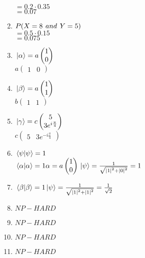 \documentclass[a4paper]{article}
\begin{document}
\begin{enumerate}[1.]
        $= 0.2 \cdot 0.35$\\
        $= 0.07$
        \item $P(X = 8 \hspace*{4px}and\hspace*{4px} Y = 5)$\\
        $= 0.5 \cdot 0.15$\\
        $= 0.075$
        \item $\ket*{\alpha} = a \begin{pmatrix}1 \\ 0\end{pmatrix}$\\
        $a \begin{pmatrix}1 & 0\end{pmatrix}$
        \item $\ket*{\beta} = a \begin{pmatrix}1 \\ 1\end{pmatrix}$\\
        $b\begin{pmatrix}1 & 1\end{pmatrix}$
        \item $\ket*{\gamma} = c \begin{pmatrix}5 \\ 3e^{i\frac{\pi}{4}}\end{pmatrix}$\\
        $c \begin{pmatrix}5 & 3e^{-i\frac{\pi}{4}}\end{pmatrix}$
        \item $\braket*{\psi}{\psi} = 1$\\
        $\braket*{\alpha}{\alpha}=1\\
        \alpha = a \begin{pmatrix}1 \\ 0\end{pmatrix}\\
        \ket*{\psi} = \frac{1}{\sqrt{\abs*{1}^2 + \abs*{0}^2}}\\
        =1$
        \item $\braket*{\beta}{\beta} = 1\\
        \ket*{\psi}=\frac{1}{\sqrt{\abs*{1}^2 + \abs*{1}^2}}\\
        =\frac{1}{\sqrt{2}}$
        \item $NP-HARD$
        \item $NP-HARD$
        \item $NP-HARD$
        \item $NP-HARD$
    \end{enumerate}
\end{document}

